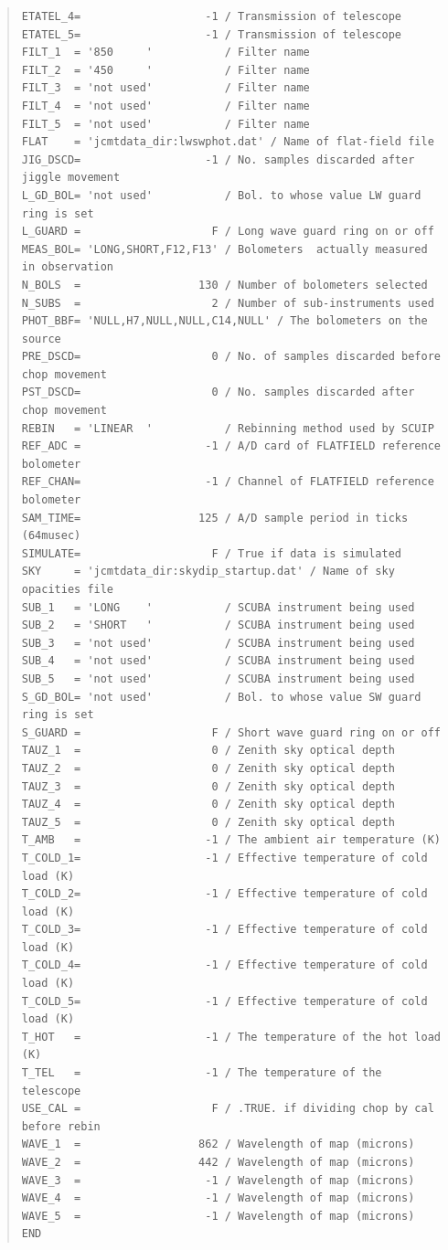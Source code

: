 \documentclass[twoside,11pt]{article}
\newenvironment{myquote}{\begin{quote}\begin{small}}{\end{small}\end{quote}}
\renewcommand{\_}{\texttt{\symbol{95}}}
\begin{document}
\begin{myquote}
\begin{verbatim}
ETATEL_4=                   -1 / Transmission of telescope
ETATEL_5=                   -1 / Transmission of telescope
FILT_1  = '850     '           / Filter name
FILT_2  = '450     '           / Filter name
FILT_3  = 'not used'           / Filter name
FILT_4  = 'not used'           / Filter name
FILT_5  = 'not used'           / Filter name
FLAT    = 'jcmtdata_dir:lwswphot.dat' / Name of flat-field file
JIG_DSCD=                   -1 / No. samples discarded after jiggle movement
L_GD_BOL= 'not used'           / Bol. to whose value LW guard ring is set
L_GUARD =                    F / Long wave guard ring on or off
MEAS_BOL= 'LONG,SHORT,F12,F13' / Bolometers  actually measured in observation
N_BOLS  =                  130 / Number of bolometers selected
N_SUBS  =                    2 / Number of sub-instruments used
PHOT_BBF= 'NULL,H7,NULL,NULL,C14,NULL' / The bolometers on the source
PRE_DSCD=                    0 / No. of samples discarded before chop movement
PST_DSCD=                    0 / No. samples discarded after chop movement
REBIN   = 'LINEAR  '           / Rebinning method used by SCUIP
REF_ADC =                   -1 / A/D card of FLATFIELD reference bolometer
REF_CHAN=                   -1 / Channel of FLATFIELD reference bolometer
SAM_TIME=                  125 / A/D sample period in ticks (64musec)
SIMULATE=                    F / True if data is simulated
SKY     = 'jcmtdata_dir:skydip_startup.dat' / Name of sky opacities file
SUB_1   = 'LONG    '           / SCUBA instrument being used
SUB_2   = 'SHORT   '           / SCUBA instrument being used
SUB_3   = 'not used'           / SCUBA instrument being used
SUB_4   = 'not used'           / SCUBA instrument being used
SUB_5   = 'not used'           / SCUBA instrument being used
S_GD_BOL= 'not used'           / Bol. to whose value SW guard ring is set
S_GUARD =                    F / Short wave guard ring on or off
TAUZ_1  =                    0 / Zenith sky optical depth
TAUZ_2  =                    0 / Zenith sky optical depth
TAUZ_3  =                    0 / Zenith sky optical depth
TAUZ_4  =                    0 / Zenith sky optical depth
TAUZ_5  =                    0 / Zenith sky optical depth
T_AMB   =                   -1 / The ambient air temperature (K)
T_COLD_1=                   -1 / Effective temperature of cold load (K)
T_COLD_2=                   -1 / Effective temperature of cold load (K)
T_COLD_3=                   -1 / Effective temperature of cold load (K)
T_COLD_4=                   -1 / Effective temperature of cold load (K)
T_COLD_5=                   -1 / Effective temperature of cold load (K)
T_HOT   =                   -1 / The temperature of the hot load (K)
T_TEL   =                   -1 / The temperature of the telescope
USE_CAL =                    F / .TRUE. if dividing chop by cal before rebin
WAVE_1  =                  862 / Wavelength of map (microns)
WAVE_2  =                  442 / Wavelength of map (microns)
WAVE_3  =                   -1 / Wavelength of map (microns)
WAVE_4  =                   -1 / Wavelength of map (microns)
WAVE_5  =                   -1 / Wavelength of map (microns)
END
\end{verbatim}
\end{myquote}
\end{document}
